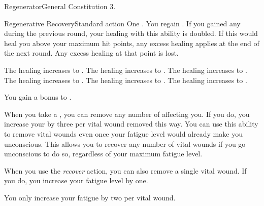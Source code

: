   \begin{feat}{Regenerator}{General}
    \featpre Constitution 3.

    \begin{activeability}{Regenerative Recovery}{Standard action}
      \abilitytags {}
      \abilitycost One .
      \rankline
      You regain \damagerankthreelow {}.
      If you gained any  during the previous round, your healing with this ability is doubled.
      If this would heal you above your maximum hit points, any excess healing applies at the end of the next round.
      Any excess healing at that point is lost.

      \rankline
       The healing increases to \damagerankfourlow.
       The healing increases to \damagerankfivelow.
       The healing increases to \damageranksixlow.
       The healing increases to \damageranksevenlow.
       The healing increases to \damagerankeightlow.
       The healing increases to \damagerankninelow.
    \end{activeability}

     You gain a  bonus to .

     When you take a , you can remove any number of  affecting you.
    If you do, you increase your  by three per vital wound removed this way.
    You can use this ability to remove vital wounds even once your fatigue level would already make you unconscious.
    This allows you to recover any number of vital wounds if you go unconscious to do so, regardless of your maximum fatigue level.

     When you use the \textit{recover} action, you can also remove a single vital wound.
    If you do, you increase your fatigue level by one.

     You only increase your fatigue by two per vital wound.
  \end{feat}

